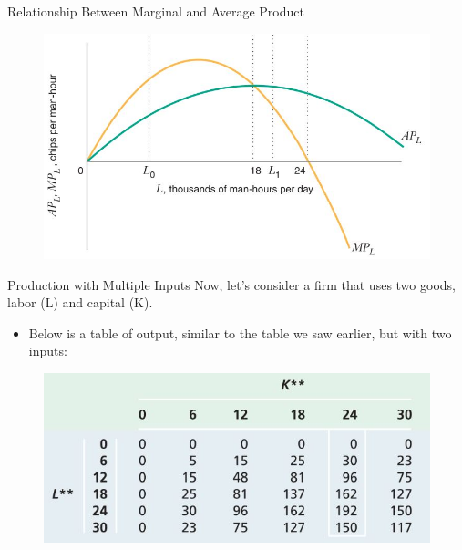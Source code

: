 \documentclass[11pt,t]{beamer}
\begin{document}
\begin{frame}{Relationship Between Marginal and Average Product}
  \begin{figure}
    \includegraphics[width=\linewidth]{figures/fig6_4b.jpg}
  \end{figure}
\end{frame}

\begin{frame}{Production with Multiple Inputs}
  Now, let's consider a firm that uses two goods, labor (L) and capital (K).
  
  \begin{itemize}
    \item Below is a table of output, similar to the table we saw earlier, but with two inputs:
  \end{itemize}

  \begin{figure}
    \includegraphics[width=\linewidth]{figures/table6_3.jpg}
  \end{figure}
\end{frame}
\end{document}
